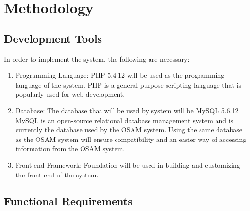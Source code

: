 \documentclass[journal]{./IEEE/IEEEtran}
\begin{document}
\section{Methodology}
\subsection{Development Tools}
In order to implement the system, the following are necessary:
\begin{enumerate}
	\item Programming Language: PHP 5.4.12 will be used as the programming language of the system. PHP is a general-purpose scripting language that is popularly used for web development.
	\item Database: The database that will be used by system will be MySQL 5.6.12 MySQL is an open-source relational database management system and is currently the database used by the OSAM system. Using the same database as the OSAM system will ensure compatibility and an easier way of accessing information from the OSAM system.
	\item Front-end Framework: Foundation will be used in building and customizing the front-end of the system.
\end{enumerate}

\subsection{Functional Requirements}
	
\end{document}
